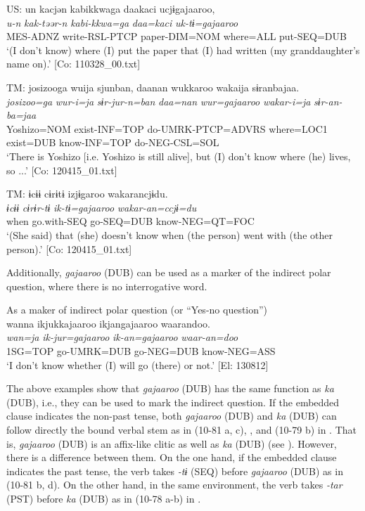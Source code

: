 \begin{xlist}
  \ex  US:  \glll un  kacjən  kabikkwaga  daakaci  ucjɨgajaaroo,\\
      \textit{u-n}  \textit{kak-təər-n}  \textit{kabi-kkwa=ga}  \textit{daa=kaci}  \textit{uk-tɨ=gajaaroo}\\
      MES-ADNZ  write-RSL{}-PTCP  paper{}-DIM=NOM  where=ALL  put-SEQ=DUB\\
      \glt       ‘(I don’t know) where (I) put the paper that (I) had written (my granddaughter’s name on).’ [Co: 110328\_00.txt]

  \ex  TM:
      \glll    {\textbar}josizoo{\textbar}ga  wuija  sjunban,  daanan wukkaroo  wakaija  sɨranbajaa.\\
      \textit{josizoo=ga}  \textit{wur-i=ja}  \textit{sɨr-jur-n=ban}  \textit{daa=nan}  \textit{wur=gajaaroo}  \textit{wakar-i=ja}  \textit{sɨr-an-ba=jaa}\\
      Yoshizo=NOM  exist-INF=TOP  do-UMRK-PTCP=ADVRS  where=LOC1  exist=DUB  know-INF=TOP  do-NEG-CSL=SOL\\
      \glt       ‘There is Yoshizo [i.e. Yoshizo is still alive], but (I) don’t know where (he) lives, so ...’ [Co: 120415\_01.txt]

  \ex  TM:
      \glll    ɨcɨɨ  cɨrɨtɨ  izjɨgaroo  wakarancjɨdu.\\
      \textit{ɨcɨɨ}  \textit{cɨrɨr-tɨ}  \textit{ik-tɨ=gajaaroo}  \textit{wakar-an=ccjɨ=du}\\
      when  go.with-SEQ  go-SEQ=DUB  know-NEG=QT=FOC\\
      \glt       ‘(She said) that (she) doesn’t know when (the person) went with (the other person).’ [Co: 120415\_01.txt]
    \z
\z

Additionally, \textit{gajaaroo} (DUB) can be used as a marker of the indirect polar question, where there is no interrogative word.

\ea\label{ex:10.82}   As a maker of indirect polar question (or “Yes-no question”)\\
      \glll    wanna  ikjukkajaaroo  ikjangajaaroo  waarandoo.\\
    \textit{wan=ja}  \textit{ik-jur=gajaaroo}  \textit{ik-an=gajaaroo}  \textit{waar-an=doo}\\
    1SG=TOP  go-UMRK=DUB  go-NEG=DUB  know-NEG=ASS\\
    \glt     ‘I don’t know whether (I) will go (there) or not.’ [El: 130812]
\z

The above examples show that \textit{gajaaroo} (DUB) has the same function as \textit{ka} (DUB), i.e., they can be used to mark the indirect question. If the embedded clause indicates the non-past tense, both \textit{gajaaroo} (DUB) and \textit{ka} (DUB) can follow directly the bound verbal stem as in (10-81 a, c), , and (10-79 b) in . That is, \textit{gajaaroo} (DUB) is an affix-like clitic as well as \textit{ka} (DUB) (see ). However, there is a difference between them. On the one hand, if the embedded clause indicates the past tense, the verb takes \textit{{}-tɨ} (SEQ) before \textit{gajaaroo} (DUB) as in (10-81 b, d). On the other hand, in the same environment, the verb takes \textit{{}-tar} (PST) before \textit{ka} (DUB) as in (10-78 a-b) in .


\end{xlist}
